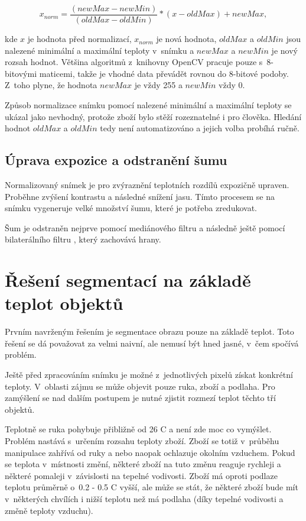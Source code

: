     \begin{equation}
  	  x_{norm} = \frac{(newMax - newMin) }{ (oldMax - oldMin)}* (x - oldMax) +newMax,
    \end{equation}
    
    kde $x$ je hodnota před normalizací, $x_{norm}$ je nová hodnota, $oldMax$ a $oldMin$ jsou nalezené minimální a maximální teploty v~snímku a $newMax$ a $newMin$ je nový rozsah hodnot. Většina algoritmů z~knihovny OpenCV pracuje pouze s~8-bitovými maticemi, takže je vhodné data převádět rovnou do 8-bitové podoby. Z~toho plyne, že hodnota $newMax$ je vždy 255 a $newMin$ vždy 0.
    
    Způsob normalizace snímku pomocí nalezené minimální a maximální teploty se ukázal jako nevhodný, protože zboží bylo stěží rozeznatelné i pro člověka. Hledání hodnot $oldMax$ a $oldMin$ tedy není automatizováno a jejich volba probíhá ručně.
   	
    \subsection{Úprava expozice a odstranění šumu}
    Normalizovaný snímek je pro zvýraznění teplotních rozdílů expozičně upraven. Proběhne zvýšení kontrastu a následné snížení jasu. Tímto procesem se na snímku vygeneruje velké množství šumu, které je potřeba zredukovat.
    
    Šum je odstraněn nejprve pomocí mediánového filtru \cite{huang1979fast} a následně ještě pomocí bilaterálního filtru \cite{tomasi1998bilateral}, který zachovává hrany.
    
\section{Řešení segmentací na základě teplot objektů} 
Prvním navrženým řešením je segmentace obrazu pouze na základě teplot. Toto řešení se dá považovat za velmi naivní, ale nemusí být hned jasné, v~čem spočívá problém.

Ještě před zpracováním snímku je možné z~jednotlivých pixelů získat konkrétní teploty. V~oblasti zájmu se může objevit pouze ruka, zboží a podlaha. Pro zamýšlení se nad dalším postupem je nutné zjistit rozmezí teplot těchto tří objektů.

Teplotně se ruka pohybuje přibližně od 26 \textdegree{}C a není zde moc co vymýšlet. Problém nastává s~určením rozsahu teploty zboží. Zboží se totiž v~průběhu manipulace zahřívá od ruky a nebo naopak ochlazuje okolním vzduchem. Pokud se teplota v~místnosti změní, některé zboží na tuto změnu reaguje rychleji a některé pomaleji v~závislosti na tepelné vodivosti. Zboží má oproti podlaze teplotu průměrně o~0.2 - 0.5 \textdegree{}C vyšší, ale může se stát, že některé zboží bude mít v~některých chvílích i nižší teplotu než má podlaha (díky tepelné vodivosti a změně teploty vzduchu). 

